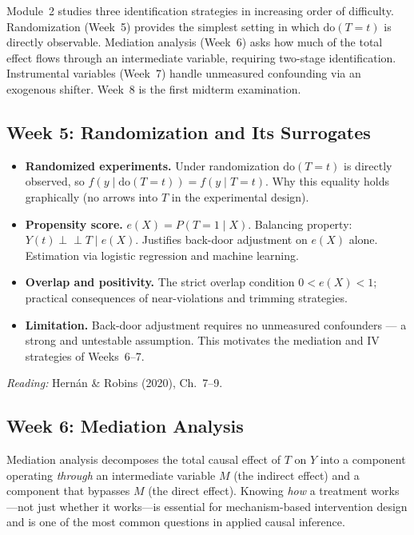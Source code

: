 \documentclass[12pt]{article}
\begin{document}
Module~2 studies three identification strategies in increasing order of
difficulty. Randomization (Week~5) provides the simplest setting in which
$\mathrm{do}(T{=}t)$ is directly observable. Mediation analysis (Week~6)
asks how much of the total effect flows through an intermediate variable,
requiring two-stage identification. Instrumental variables (Week~7) handle
unmeasured confounding via an exogenous shifter. Week~8 is the first midterm
examination.

\subsection{Week 5: Randomization and Its Surrogates}

\begin{itemize}
  \item \textbf{Randomized experiments.}
    Under randomization $\mathrm{do}(T{=}t)$ is directly observed, so
    $f(y \mid \mathrm{do}(T{=}t)) = f(y \mid T{=}t)$.
    Why this equality holds graphically (no arrows into $T$ in the
    experimental design).

  \item \textbf{Propensity score.}
    $e(X) = P(T{=}1 \mid X)$.  Balancing property:
    $Y(t) \perp\!\!\!\perp T \mid e(X)$.
    Justifies back-door adjustment on $e(X)$ alone.
    Estimation via logistic regression and machine learning.

  \item \textbf{Overlap and positivity.}
    The strict overlap condition $0 < e(X) < 1$; practical consequences
    of near-violations and trimming strategies.

  \item \textbf{Limitation.}
    Back-door adjustment requires no unmeasured confounders --- a strong
    and untestable assumption. This motivates the mediation and IV
    strategies of Weeks~6--7.
\end{itemize}

\noindent\textit{Reading:} Hern\'an \& Robins (2020), Ch.~7--9.

\subsection{Week 6: Mediation Analysis}

Mediation analysis decomposes the total causal effect of $T$ on $Y$ into
a component operating \emph{through} an intermediate variable $M$ (the
indirect effect) and a component that bypasses $M$ (the direct effect).
Knowing \emph{how} a treatment works---not just whether it works---is
essential for mechanism-based intervention design and is one of the most
common questions in applied causal inference.
\end{document}
